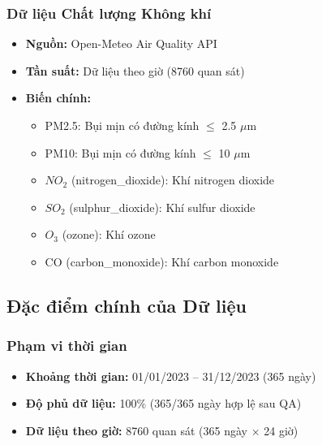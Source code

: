\documentclass[12pt,a4paper]{article}
\begin{document}
\subsubsection{Dữ liệu Chất lượng Không khí}
\begin{itemize}
    \item \textbf{Nguồn:} Open-Meteo Air Quality API
    \item \textbf{Tần suất:} Dữ liệu theo giờ (8760 quan sát)
    \item \textbf{Biến chính:}
    \begin{itemize}
        \item PM2.5: Bụi mịn có đường kính $\leq$ 2.5 $\mu$m
        \item PM10: Bụi mịn có đường kính $\leq$ 10 $\mu$m
        \item $NO_2$ (nitrogen\_dioxide): Khí nitrogen dioxide
        \item $SO_2$ (sulphur\_dioxide): Khí sulfur dioxide
        \item $O_3$ (ozone): Khí ozone
        \item CO (carbon\_monoxide): Khí carbon monoxide
    \end{itemize}
\end{itemize}

\subsection{Đặc điểm chính của Dữ liệu}

\subsubsection{Phạm vi thời gian}
\begin{itemize}
    \item \textbf{Khoảng thời gian:} 01/01/2023 -- 31/12/2023 (365 ngày)
    \item \textbf{Độ phủ dữ liệu:} 100\% (365/365 ngày hợp lệ sau QA)
    \item \textbf{Dữ liệu theo giờ:} 8760 quan sát (365 ngày × 24 giờ)
\end{itemize}
\end{document}

